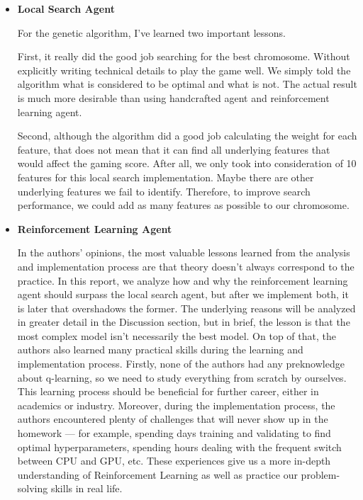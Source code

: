 \documentclass[letterpaper]{article} %
\begin{document}
\begin{itemize}
  \item \textbf{Local Search Agent}
  
  For the genetic algorithm, I've learned two important lessons. 
  
  First, it really did the good job searching for the best chromosome. Without explicitly writing technical details to play the game well. We simply told the algorithm what is considered to be optimal and what is not. The actual result is much more desirable than using handcrafted agent and reinforcement learning agent. 
  
  Second, although the algorithm did a good job calculating the weight for each feature, that does not mean that it can find all underlying features that would affect the gaming score. After all, we only took into consideration of 10 features for this local search implementation. Maybe there are other underlying features we fail to identify. Therefore, to improve search performance, we could add as many features as possible to our chromosome. 
  
  \item \textbf{Reinforcement Learning Agent}
  
  In the authors' opinions, the most valuable lessons learned from the analysis and implementation process are that theory doesn't always correspond to the practice. In this report, we analyze how and why the reinforcement learning agent should surpass the local search agent, but after we implement both, it is later that overshadows the former. The underlying reasons will be analyzed in greater detail in the Discussion section, but in brief, the lesson is that the most complex model isn't necessarily the best model. On top of that, the authors also learned many practical skills during the learning and implementation process. Firstly, none of the authors had any preknowledge about q-learning, so we need to study everything from scratch by ourselves. This learning process should be beneficial for further career, either in academics or industry. Moreover, during the implementation process, the authors encountered plenty of challenges that will never show up in the homework — for example, spending days training and validating to find optimal hyperparameters, spending hours dealing with the frequent switch between CPU and GPU, etc. These experiences give us a more in-depth understanding of Reinforcement Learning as well as practice our problem-solving skills in real life. 
\end{itemize}
\end{document}
